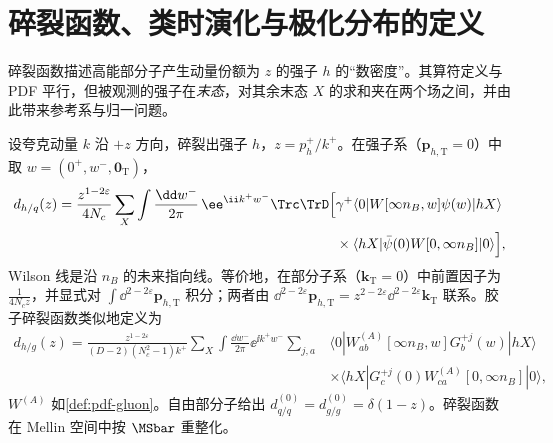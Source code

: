 \section{碎裂函数、类时演化与极化分布的定义}\label{sec:pdf-ff}

碎裂函数描述高能部分子产生动量份额为 $z$ 的强子 $h$ 的“数密度”。其算符定义与 PDF 平行，但被观测的强子在\emph{末态}，对其余末态 $X$ 的求和夹在两个场之间，并由此带来参考系与归一问题。

\begin{definition}[碎裂函数]\label{def:pdf-ff}
设夸克动量 $k$ 沿 $+z$ 方向，碎裂出强子 $h$，$z=p_h^+/k^+$。在强子系（$\bm p_{h,\mathrm T}=0$）中取 $w=(0^+,w^-,\bm 0_{\mathrm T})$，
\begin{equation}\label{eq:pdf-ff}
\begin{aligned}
d_{h/q}(z)=\frac{z^{1-2\varepsilon}}{4N_c}\sum_X\int\frac{\dd w^-}{2\pi}\,\ee^{\ii k^+w^-}\Trc\TrD\Big[&\gamma^+\langle0|W[\infty n_B,w]\psi(w)|hX\rangle\\
&\times\langle hX|\bar\psi(0)W[0,\infty n_B]|0\rangle\Big],
\end{aligned}
\end{equation}
Wilson 线是沿 $n_B$ 的未来指向线。等价地，在部分子系（$\bm k_{\mathrm T}=0$）中前置因子为 $\frac1{4N_cz}$，并显式对 $\int\dd^{2-2\varepsilon}\bm p_{h,\mathrm T}$ 积分；两者由 $\dd^{2-2\varepsilon}\bm p_{h,\mathrm T}=z^{2-2\varepsilon}\dd^{2-2\varepsilon}\bm k_{\mathrm T}$ 联系。胶子碎裂函数类似地定义为
\begin{equation}\label{eq:pdf-ffg}
\begin{aligned}
d_{h/g}(z)=\frac{z^{1-2\varepsilon}}{(D-2)(N_c^2-1)k^+}\sum_X\int\frac{\dd w^-}{2\pi}\ee^{\ii k^+w^-}\sum_{j,a}&\langle0|W^{(A)}_{ab}[\infty n_B,w]G^{+j}_b(w)|hX\rangle\\
&\times\langle hX|G^{+j}_c(0)W^{(A)}_{ca}[0,\infty n_B]|0\rangle,
\end{aligned}
\end{equation}
$W^{(A)}$ 如\cref{def:pdf-gluon}。自由部分子给出 $d^{(0)}_{q/q}=d^{(0)}_{g/g}=\delta(1-z)$。碎裂函数在 Mellin 空间中按 $\MSbar$ 重整化。
\end{definition}

